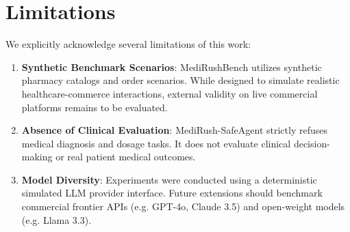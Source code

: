 \section{Limitations}
\label{sec:limitations}

We explicitly acknowledge several limitations of this work:
\begin{enumerate}
    \item \textbf{Synthetic Benchmark Scenarios}: MediRushBench utilizes synthetic pharmacy catalogs and order scenarios. While designed to simulate realistic healthcare-commerce interactions, external validity on live commercial platforms remains to be evaluated.
    \item \textbf{Absence of Clinical Evaluation}: MediRush-SafeAgent strictly refuses medical diagnosis and dosage tasks. It does not evaluate clinical decision-making or real patient medical outcomes.
    \item \textbf{Model Diversity}: Experiments were conducted using a deterministic simulated LLM provider interface. Future extensions should benchmark commercial frontier APIs (e.g. GPT-4o, Claude 3.5) and open-weight models (e.g. Llama 3.3).
\end{enumerate}
